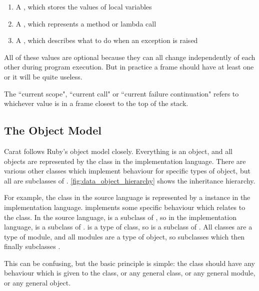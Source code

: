 \begin{enumerate}
  \item A , which stores the values of local variables
  \item A , which represents a method or lambda call
  \item A , which describes what to do when an exception is raised
\end{enumerate}

All of these values are optional because they can all change independently of each other during program execution. But in practice a frame should have at least one or it will be quite useless.

The ``current scope", ``current call" or ``current failure continuation" refers to whichever value is in a frame closest to the top of the stack.

\subsection{The Object Model}
\label{sec:object_model}

Carat follows Ruby's object model closely. Everything is an object, and all objects are represented by the class  in the implementation language. There are various other classes which implement behaviour for specific types of object, but all are subclasses of . \autoref{fig:data_object_hierarchy} shows the inheritance hierarchy.

For example, the class  in the source language is represented by a  instance in the implementation language.  implements some specific behaviour which relates to the  class. In the source language,  is a subclass of , so in the implementation language,  is a subclass of .  is a type of class, so  is a subclass of . All classes are a type of module, and all modules are a type of object, so  subclasses  which then finally subclasses .

This can be confusing, but the basic principle is simple: the  class should have any behaviour which is given to the  class, or any general class, or any general module, or any general object.

